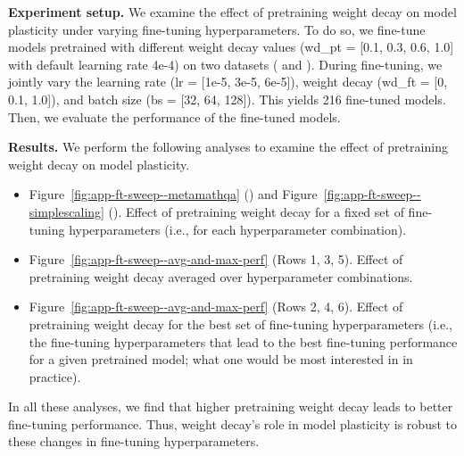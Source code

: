 \textbf{Experiment setup.} 
We examine the effect of pretraining weight decay on model plasticity under varying fine-tuning hyperparameters. To do so, we fine-tune \olmoonex{} models pretrained with different weight decay values (wd\_pt = [0.1, 0.3, 0.6, 1.0] with default learning rate 4e-4) on two datasets (\metamathqa{} and \simplescaling{}). During fine-tuning, we jointly
vary the learning rate (lr = [1e-5, 3e-5, 6e-5]), weight decay (wd\_ft = [0, 0.1, 1.0]), and batch size (bs = [32, 64, 128]). This yields 216 fine-tuned models. Then, we evaluate the performance of the fine-tuned models.


\textbf{Results.} 
We perform the following analyses to examine the effect of pretraining weight decay on model plasticity.

\begin{itemize}
    \item Figure~\ref{fig:app-ft-sweep--metamathqa} (\metamathqa{}) and Figure~\ref{fig:app-ft-sweep--simplescaling} (\simplescaling{}). Effect of pretraining weight decay for a fixed set of fine-tuning hyperparameters (i.e., for each hyperparameter combination).

    \item Figure~\ref{fig:app-ft-sweep--avg-and-max-perf} (Rows 1, 3, 5). Effect of pretraining weight decay averaged over hyperparameter combinations.

    \item Figure~\ref{fig:app-ft-sweep--avg-and-max-perf} (Rows 2, 4, 6). Effect of pretraining weight decay for the best set of fine-tuning hyperparameters (i.e., the fine-tuning hyperparameters that lead to the best fine-tuning performance for a given pretrained model; what one would be most interested in in practice).
\end{itemize}

In all these analyses, we find that higher pretraining weight decay leads to better fine-tuning performance. Thus, weight decay's role in model plasticity is robust to these changes in fine-tuning hyperparameters.







